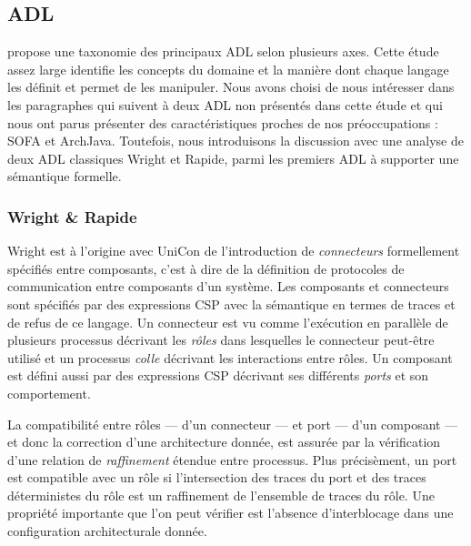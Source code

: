 \subsection{ADL}

\cite{survey-long} propose une taxonomie des
principaux \textsf{ADL} selon plusieurs axes. Cette \'etude assez
large identifie les concepts du domaine et la mani\`ere dont chaque
langage les d\'efinit et 
permet de les manipuler. Nous avons choisi de nous int\'eresser dans les paragraphes qui suivent
\`a deux \textsf{ADL} non pr\'esent\'es dans cette \'etude et qui nous ont parus
pr\'esenter des caract\'eristiques proches de nos pr\'eoccupations
: \textsf{SOFA} et \textsf{ArchJava}. Toutefois, nous introduisons la
discussion avec une analyse de deux \textsf{ADL} \og classiques\fg
\textsf{Wright} et \textsf{Rapide}, parmi les premiers
\textsf{ADL} \`a supporter une s\'emantique formelle. 

\subsubsection{Wright \& Rapide}
\label{sec:wright}

\textsf{Wright}\cite{archcon} est \`a l'origine avec
\textsf{UniCon}\cite{shaw-abstract-archi}  de l'introduction de
\emph{connecteurs} formellement sp\'ecifi\'es entre composants,
c'est \`a dire de la d\'efinition de protocoles de communication
entre composants d'un syst\`eme. Les composants et connecteurs sont
sp\'ecifi\'es par des expressions \textsf{CSP}\cite{hoare-csp} avec la
s\'emantique en termes de traces et de refus de ce langage. Un
connecteur est vu comme l'ex\'ecution en parall\`ele de plusieurs
processus d\'ecrivant les \emph{r\^oles} dans lesquelles le
connecteur peut-\^etre utilis\'e et un processus \emph{colle}
d\'ecrivant les interactions entre r\^oles. Un composant est
d\'efini aussi par des expressions \textsf{CSP} d\'ecrivant ses diff\'erents
\emph{ports} et son comportement. 

La compatibilit\'e
entre r\^oles --- d'un connecteur --- et port --- d'un composant ---
et donc la correction d'une architecture donn\'ee, est assur\'ee par
la v\'erification d'une relation de \emph{raffinement} \'etendue
entre processus. Plus pr\'ecis\`ement, un port est compatible avec
un r\^ole si l'intersection des traces du port et des traces
d\'eterministes du r\^ole est un raffinement de l'ensemble de traces
du r\^ole. Une propri\'et\'e importante que l'on peut v\'erifier
est l'absence d'interblocage dans une configuration architecturale
donn\'ee. 

